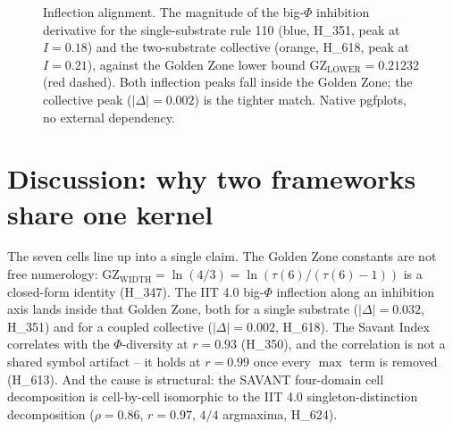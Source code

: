 \documentclass[11pt,a4paper]{article}
\newcommand{\GZL}{\mathrm{GZ_{LOWER}}}
\newcommand{\GZW}{\mathrm{GZ_{WIDTH}}}
\begin{document}
\begin{figure}[h]
\centering
{}
\caption{Inflection alignment. The magnitude of the big-$\Phi$ inhibition
derivative for the single-substrate rule 110 (blue, H\_351, peak at
$I=0.18$) and the two-substrate collective (orange, H\_618, peak at
$I=0.21$), against the Golden Zone lower bound $\GZL=0.21232$ (red dashed).
Both inflection peaks fall inside the Golden Zone; the collective peak
($|\Delta|=0.002$) is the tighter match. Native pgfplots, no external
dependency.}
\label{fig:peak}
\end{figure}

\section{Discussion: why two frameworks share one kernel}
\label{sec:discuss}

The seven cells line up into a single claim. The Golden Zone constants are
not free numerology: $\GZW=\ln(4/3)=\ln(\tau(6)/(\tau(6)-1))$ is a
closed-form identity (H\_347). The IIT 4.0 big-$\Phi$ inflection along an
inhibition axis lands inside that Golden Zone, both for a single substrate
($|\Delta|=0.032$, H\_351) and for a coupled collective
($|\Delta|=0.002$, H\_618). The Savant Index correlates with the
$\Phi$-diversity at $r=0.93$ (H\_350), and the correlation is not a shared
symbol artifact -- it holds at $r=0.99$ once every $\max$ term is removed
(H\_613). And the cause is structural: the SAVANT four-domain cell
decomposition is cell-by-cell isomorphic to the IIT 4.0
singleton-distinction decomposition ($\rho=0.86$, $r=0.97$, $4/4$
argmaxima, H\_624).
\end{document}
